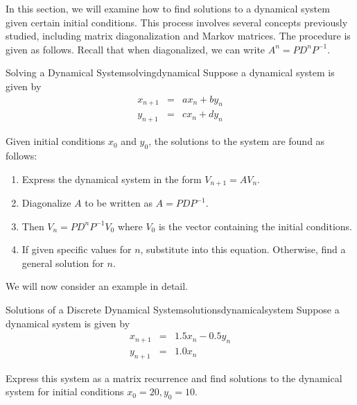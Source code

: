 In this section, we will examine how to find solutions to a dynamical system given certain initial conditions. This process involves several concepts previously studied, including matrix diagonalization and Markov matrices. The procedure is given as follows. Recall that when diagonalized, we can write $A^{n} = PD^{n}P^{-1}$. 

\begin{procedure}{Solving a Dynamical System}{solvingdynamical}
Suppose a dynamical system is given by  
\begin{eqnarray*}
x_{n+1} &=& a x_n + b y_n \\
y_{n+1} &=& c x_n + d y_n
\end{eqnarray*}

Given initial conditions $x_0$ and $y_0$, the solutions to the system are found as follows:
\begin{enumerate}
\item
Express the dynamical system in the form $V_{n+1} = AV_n$.
\item
Diagonalize $A$ to be written as $A = PDP^{-1}$.
\item 
Then $V_{n} = PD^{n} P^{-1} V_{0}$ where $V_{0}$ is the vector containing the initial conditions. 
\item
If given specific values for $n$, substitute into this equation. Otherwise, find a general solution for $n$.
\end{enumerate}
\end{procedure}

We will now consider an example in detail.

\begin{example}{Solutions of a Discrete Dynamical System}{solutionsdynamicalsystem}
Suppose a dynamical system is given by 
\begin{eqnarray*}
x_{n+1} &=& 1.5 x_n - 0.5y_n\\
y_{n+1} &=& 1.0 x_n
\end{eqnarray*}

Express this system as a matrix recurrence and find solutions to the dynamical system for initial conditions $x_0=20, y_0=10$. 
\end{example}

